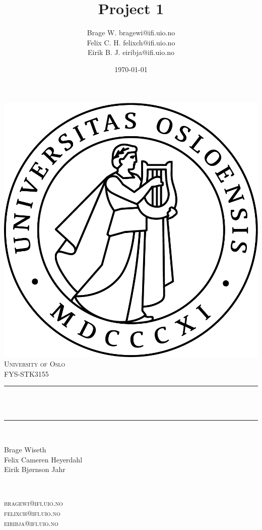 \documentclass[twoside,11pt]{report}
\title{{\huge Project 1}}
\author{\name Brage W. \email bragewi@ifi.uio.no\\
       \name Felix C. H.  \email felixch@ifi.uio.no \\
       \name Eirik B. J. \email eiribja@ifi.uio.no}
\date{\today}											%
\begin{document}

\begin{titlepage}
	\centering
    \vspace*{0.5 cm}
    \includegraphics[scale = 0.75]{uio.jpg}\\[1.0 cm]	%
    \textsc{\LARGE University of Oslo}\\[2.0 cm]	    %
	\textsc{\Large FYS-STK3155}\\[0.5 cm]				%
	\rule{\linewidth}{0.2 mm} \\[0.4 cm]
	{ \huge \bfseries \@title}\\
	\rule{\linewidth}{0.2 mm} \\[1.5 cm]

	\begin{minipage}{0.4\textwidth}
		\begin{flushleft} \normalsize
            Brage Wiseth\\
            Felix Cameren Heyerdahl\\
            Eirik Bjørnson Jahr\\
			\end{flushleft}
			\end{minipage}~
			\begin{minipage}{0.4\textwidth}
			\begin{flushright} \normalsize
        \textsc{
          bragewi@ifi.uio.no\\
          felixch@ifi.uio.no\\
          eiribja@ifi.uio.no\\
        }
		\end{flushright}
        

\end{minipage}
\end{titlepage}
\end{document}
